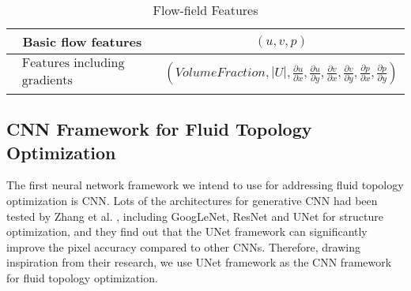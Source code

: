 \documentclass{article}
\begin{document}
\begin{table*}
    \centering
    \caption{Flow-field Features}
\begin{tabular}{c|c}
\hline Basic flow features & $(u, v, p)$ \\
\hline $\begin{array}{c}\text { Features including spatial } \\
\text { gradients }\end{array}$ & $\left(Volume Fraction, |U|,\frac{\partial u}{\partial x}, \frac{\partial u}{\partial y}, \frac{\partial v}{\partial x}, \frac{\partial v}{\partial y}, \frac{\partial p}{\partial x}, \frac{\partial p}{\partial y}\right)$ \\
\hline
\end{tabular}
    \label{table::designvariables}
\end{table*}

\subsection{CNN Framework for Fluid Topology Optimization\label{Sec::CNN}}
The first neural network framework we intend to use for addressing fluid topology optimization is CNN.
Lots of the architectures for generative CNN had been tested by Zhang et al. \cite{3-TopoCNN-wang2022deep}, including GoogLeNet\cite{7-1-szegedy2015going}, ResNet \cite{7-2-he2016deep} and UNet\cite{7-3-ronneberger2015u} for structure optimization, and they find out that the UNet framework can significantly improve the pixel accuracy compared to other CNNs. Therefore, drawing inspiration from their research, we use UNet framework as the CNN framework for fluid topology optimization.\\
\end{document}

